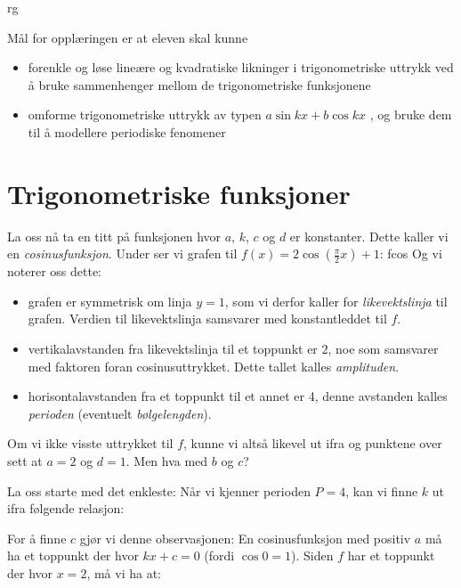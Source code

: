 



{rg}

Mål for opplæringen er at eleven skal kunne
\begin{itemize}
	\item forenkle og løse lineære og kvadratiske likninger i trigonometriske uttrykk ved å bruke sammenhenger mellom de trigonometriske funksjonene
	\item omforme trigonometriske uttrykk av typen $ a \sin kx + b \cos kx $ , og bruke dem til å modellere periodiske fenomener
\end{itemize}
\newpage
\section{Trigonometriske funksjoner}
La oss nå ta en titt på funksjonen
hvor $ a $, $ k $, $ c $ og $ d $ er konstanter. Dette kaller vi en \textit{cosinusfunksjon}. Under ser vi grafen til $ f(x)= 2\cos\left(\frac{\pi}{2} x\right)+1 $:
{fcos} 
Og vi noterer oss dette: \vs
\begin{itemize}
	\item grafen er symmetrisk om linja $ y=1 $, som vi derfor kaller for \textit{likevektslinja} til grafen. Verdien til likevektslinja samsvarer med konstantleddet til $ f $.
	\item vertikalavstanden fra likevektslinja til et toppunkt er $ 2 $, noe som samsvarer med faktoren foran cosinusuttrykket. Dette tallet kalles \textit{amplituden}.
	\item horisontalavstanden fra et toppunkt til et annet er 4, denne avstanden kalles \textit{perioden} (eventuelt \textit{bølgelengden}). 
\end{itemize}
Om vi ikke visste uttrykket til $ f $, kunne vi altså likevel ut ifra   og punktene over sett at $ a=2 $ og $ d=1 $. Men hva med $ b $ og $ c $? 

La oss starte med det enkleste: Når vi kjenner perioden $ P=4 $, kan vi finne $ k $ ut ifra følgende relasjon:

For å finne $ c $ gjør vi denne observasjonen: En cosinusfunksjon med positiv $ a $ må ha et toppunkt der hvor $ kx+c=0 $ (fordi $ \cos 0=1 $). Siden $ f $ har et toppunkt der hvor $ x=2 $, må vi ha at:


